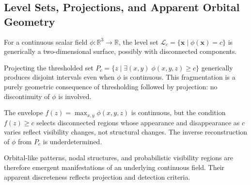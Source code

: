 \subsection{Level Sets, Projections, and Apparent Orbital Geometry}
\label{app:level_sets_orbitals}

For a continuous scalar field
$\phi : \mathbb{R}^3 \to \mathbb{R}$, the level set
$\mathcal{L}_c
  = \{\mathbf{x} \mid \phi(\mathbf{x}) = c\}$
is generically a two-dimensional surface, possibly with disconnected
components.

Projecting the thresholded set
$P_c
  = \{z \mid \exists(x,y)\;\phi(x,y,z) \ge c\}$
generically produces disjoint intervals even when $\phi$ is
continuous.
This fragmentation is a purely geometric consequence of thresholding
followed by projection: no discontinuity of $\phi$ is involved.

The envelope $f(z) = \max_{x,y}\phi(x,y,z)$ is continuous, but the
condition $f(z) \ge c$ selects disconnected regions whose appearance
and disappearance as $c$ varies reflect visibility changes, not
structural changes.
The inverse reconstruction of $\phi$ from $P_c$ is underdetermined.

Orbital-like patterns, nodal structures, and probabilistic visibility
regions are therefore emergent manifestations of an underlying
continuous field.
Their apparent discreteness reflects projection and detection
criteria.
